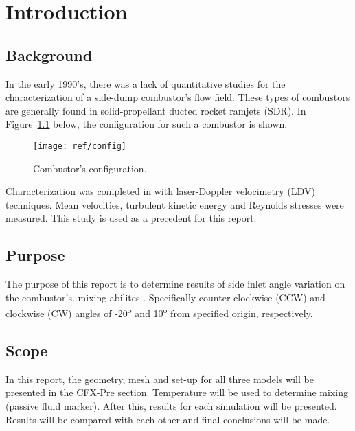 \chapter{Introduction}
\label{ch:intro}

\section{Background}
\label{sect:background}

In the early 1990's, there was a lack of quantitative studies for the characterization of a side-dump combustor's flow field. These types of combustors are generally found in solid-propellant ducted rocket ramjets (SDR). In Figure~\ref{fig:config} below, the configuration for such a combustor is shown.

\begin{figure}[H]
	\centering
	\texttt{[image: ref/config]}
	\caption[Combustor's configuration.]{Combustor's configuration. \cite{art}}
	\label{fig:config}
\end{figure}

Characterization was completed in \cite{art} with laser-Doppler velocimetry (LDV) techniques. Mean velocities, turbulent kinetic energy and Reynolds stresses were measured. This study is used as a precedent for this report.

\section{Purpose}
\label{sect:purpose}

The purpose of this report is  to determine results of side inlet angle variation on the combustor's. mixing abilites \cite{proj}. Specifically counter-clockwise (CCW) and clockwise (CW) angles of -20\textsuperscript{o} and 10\textsuperscript{o} from specified origin, respectively.


\section{Scope}
In this report, the geometry, mesh and set-up for all three models will be presented in the CFX-Pre section. Temperature will be used to determine mixing (passive fluid marker). After this, results for each simulation will be presented. Results will be compared with each other and final conclusions will be made.